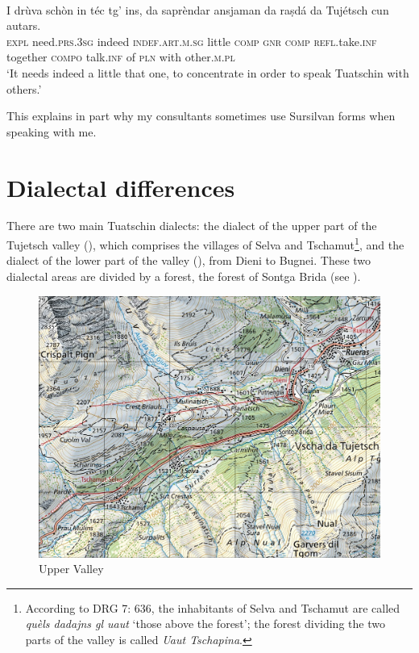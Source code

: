 \ea
\label{}
\\
\gll I drùva schòn in téc tg' ins, da saprèndar ansjaman da raṣdá da Tujétsch cun autars.\\
\textsc{expl} need.\textsc{prs.3sg} indeed \textsc{indef.art.m.sg} little \textsc{comp} \textsc{gnr} \textsc{comp} \textsc{refl}.take.\textsc{inf} together \textsc{compo} talk.\textsc{inf} of \textsc{pln} with other.\textsc{m.pl}\\
\glt `It needs indeed a little that one, to concentrate in order to speak Tuatschin with others.'
\z

This explains in part why my consultants sometimes use Sursilvan forms when speaking with me.

\section{Dialectal differences}
There are two main Tuatschin dialects: the dialect of the upper part of the Tujetsch valley (), which comprises the villages of Selva and Tschamut\footnote{According to DRG 7: 636, the inhabitants of Selva and Tschamut are called \textit{quèls dadajns gl uaut} `those above the forest'; the forest dividing the two parts of the valley is called \textit{Uaut Tschapina}.}, and the dialect of the lower part of the valley (), from Dieni to Bugnei. These two dialectal areas are divided by a forest, the forest of Sontga Brida (see \citet[3]{Caduff1952}). 

\begin{figure}
	\includegraphics[height=.5\textheight]{figures/Upper Valley.png}
	\caption{Upper Valley}
	\label{fig:uppervalley}
\end{figure}

